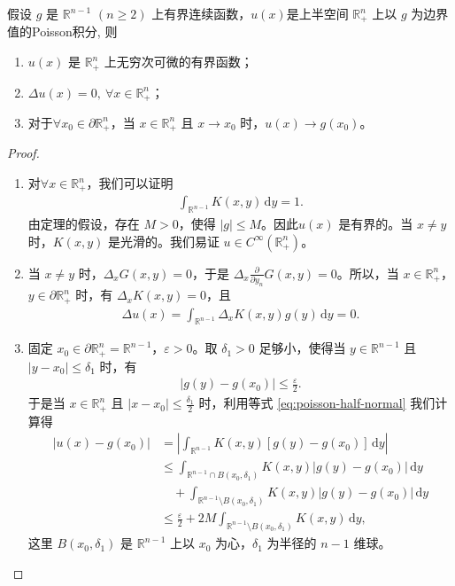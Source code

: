 \documentclass[../../main.tex]{subfiles}%
\begin{document}
\begin{theorem}
假设 $g$ 是 $\mathbb{R}^{n-1}$ $(n\geqslant 2)$ 上有界连续函数，$u(x)$是上半空间 $\mathbb{R}_+^n$ 上以 $g$ 为边界值的Poisson积分,
则
\begin{enumerate}[(1)]
\item $u(x)$ 是 $\mathbb{R}_+^n$ 上无穷次可微的有界函数；

\item $\Delta u(x)=0,\ \forall x\in\mathbb{R}_+^n$；

\item 对于$\forall x_0\in\partial\mathbb{R}_+^n$，当 $x\in\mathbb{R}_+^n$ 且 $x\to x_0$ 时，$u(x)\to g(x_0)$。
\end{enumerate}
\end{theorem}
\begin{proof}
\begin{enumerate}[(1)]
\item 对$\forall x\in\mathbb{R}_+^n$，我们可以证明
\begin{align}
\int_{\mathbb{R}^{n-1}} K(x,y)\,\mathrm{d}y = 1. \label{eq:poisson-half-normal}
\end{align}
由定理的假设，存在 $M>0$，使得 $|g|\leqslant M$。因此$u(x)$ 是有界的。当 $x\neq y$ 时，$K(x,y)$ 是光滑的。我们易证 $u\in C^\infty(\mathbb{R}_+^n)$。

\item 当 $x\neq y$ 时，$\Delta_x G(x,y)=0$，于是 $\Delta_x \frac{\partial}{\partial y_n}G(x,y)=0$。所以，当 $x\in\mathbb{R}_+^n$，$y\in\partial\mathbb{R}_+^n$ 时，有 $\Delta_x K(x,y)=0$，且
\begin{align*}
\Delta u(x) = \int_{\mathbb{R}^{n-1}} \Delta_x K(x,y)g(y)\,\mathrm{d}y = 0.
\end{align*}

\item 固定 $x_0\in\partial\mathbb{R}_+^n=\mathbb{R}^{n-1}$，$\varepsilon>0$。取 $\delta_1>0$ 足够小，使得当 $y\in\mathbb{R}^{n-1}$ 且 $|y-x_0|\leqslant \delta_1$ 时，有
\begin{align*}
|g(y)-g(x_0)| \leqslant \frac{\varepsilon}{2}.
\end{align*}
于是当 $x\in\mathbb{R}_+^n$ 且 $|x-x_0|\leqslant \frac{\delta_1}{2}$ 时，利用等式 \eqref{eq:poisson-half-normal} 我们计算得
\begin{align*}
|u(x)-g(x_0)| &= \left| \int_{\mathbb{R}^{n-1}} K(x,y)[g(y)-g(x_0)]\,\mathrm{d}y \right| \\
&\leqslant \int_{\mathbb{R}^{n-1}\cap B(x_0,\delta_1)} K(x,y)|g(y)-g(x_0)|\,\mathrm{d}y \\
&\quad + \int_{\mathbb{R}^{n-1}\setminus B(x_0,\delta_1)} K(x,y)|g(y)-g(x_0)|\,\mathrm{d}y \\
&\leqslant \frac{\varepsilon}{2} + 2M\int_{\mathbb{R}^{n-1}\setminus B(x_0,\delta_1)} K(x,y)\,\mathrm{d}y,
\end{align*}
这里 $B(x_0,\delta_1)$ 是 $\mathbb{R}^{n-1}$ 上以 $x_0$ 为心，$\delta_1$ 为半径的 $n-1$ 维球。


\end{enumerate}
\end{proof}
\end{document}
